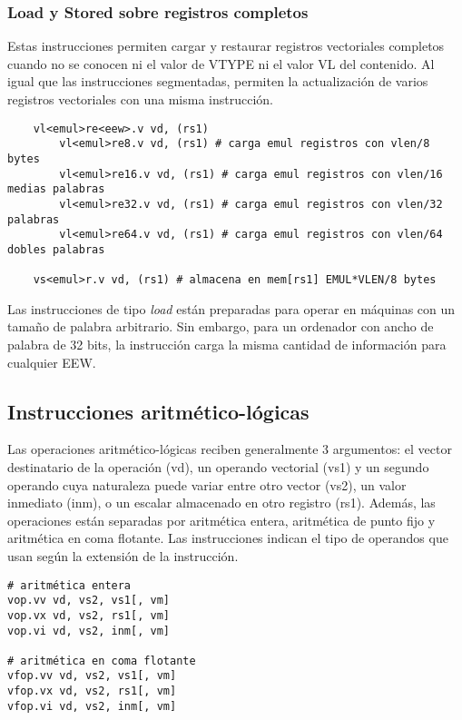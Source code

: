 \subsubsection{Load y Stored sobre registros completos}
Estas instrucciones permiten cargar y restaurar registros vectoriales
completos cuando no se conocen ni el valor de VTYPE ni el valor VL del
contenido. Al igual que las instrucciones segmentadas, permiten la
actualización de varios registros vectoriales con una misma instrucción.

\begin{lstlisting}
    vl<emul>re<eew>.v vd, (rs1)
        vl<emul>re8.v vd, (rs1) # carga emul registros con vlen/8 bytes
        vl<emul>re16.v vd, (rs1) # carga emul registros con vlen/16 medias palabras
        vl<emul>re32.v vd, (rs1) # carga emul registros con vlen/32 palabras
        vl<emul>re64.v vd, (rs1) # carga emul registros con vlen/64 dobles palabras

    vs<emul>r.v vd, (rs1) # almacena en mem[rs1] EMUL*VLEN/8 bytes
\end{lstlisting}

Las instrucciones de tipo \textit{load} están preparadas para operar en
máquinas con un tamaño de palabra arbitrario. Sin embargo, para un ordenador
con ancho de palabra de 32 bits, la instrucción carga la misma cantidad de
información para cualquier EEW.

\subsection{Instrucciones aritmético-lógicas}

Las operaciones aritmético-lógicas reciben generalmente 3 argumentos: el vector
destinatario de la operación (vd), un operando vectorial (vs1) y un segundo
operando cuya naturaleza puede variar entre otro vector (vs2), un valor
inmediato (inm), o un escalar almacenado en otro registro (rs1). Además, las
operaciones están separadas por aritmética entera, aritmética de punto fijo y
aritmética en coma flotante. Las instrucciones indican el tipo de operandos que
usan según la extensión de la instrucción.

\begin{lstlisting}
# aritmética entera
vop.vv vd, vs2, vs1[, vm]
vop.vx vd, vs2, rs1[, vm]
vop.vi vd, vs2, inm[, vm]

# aritmética en coma flotante
vfop.vv vd, vs2, vs1[, vm]
vfop.vx vd, vs2, rs1[, vm]
vfop.vi vd, vs2, inm[, vm]
\end{lstlisting}

